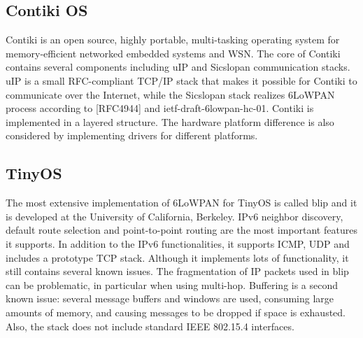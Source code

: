 \documentclass[10pt]{article}
\begin{document}
\subsection{Contiki OS}
Contiki is an open source, highly portable, multi-tasking operating system for memory-efficient networked embedded systems and WSN.  The core of Contiki contains several components including uIP and Sicslopan communication stacks. uIP is a small RFC-compliant TCP/IP stack that makes it possible for Contiki to communicate over the Internet, while the Sicslopan stack realizes 6LoWPAN process according to [RFC4944] and ietf-draft-6lowpan-hc-01.  Contiki is implemented in a layered structure.  The hardware platform difference is also considered by implementing drivers for different platforms.  

\subsection{TinyOS}
The most extensive implementation of 6LoWPAN for TinyOS is called blip and it is developed at the University of California, Berkeley.  IPv6 neighbor discovery, default route selection and point-to-point routing are the most important features it supports. In addition to the IPv6 functionalities, it supports ICMP, UDP and includes a prototype TCP stack.  Although it implements lots of functionality, it still contains several known issues.  The fragmentation of IP packets used in blip can be problematic, in particular when using multi-hop.  Buffering is a second known issue: several message buffers and windows are used, consuming large amounts of memory, and causing messages to be dropped if space is exhausted. Also, the stack does not include standard IEEE 802.15.4 interfaces.  
\end{document}
